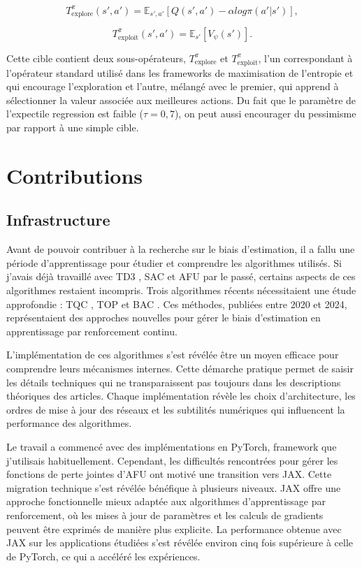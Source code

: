 \documentclass[a4paper, 12pt]{report}
\begin{document}
    $$
    T^\pi_{\text{explore}} (s', a') = \mathbb{E}_{s',a'} [ Q(s', a') - \alpha log \pi(a'|s')],
    $$

    $$
    T^\pi_{\text{exploit}} (s', a') = \mathbb{E}_{s'} [V_\psi (s')].
    $$

    Cette cible contient deux sous-opérateurs, $T^\pi_{\text{explore}}$ et
    $T^\pi_{\text{exploit}}$, l'un correspondant à l'opérateur standard utilisé
    dans les frameworks de maximisation de l'entropie et qui encourage
    l'exploration et l'autre, mélangé avec le premier, qui apprend à
    sélectionner la valeur associée aux meilleures actions. Du fait que le
    paramètre de l'expectile regression est faible ($\tau = 0,7$), on peut
    aussi encourager du pessimisme par rapport à une simple cible.

    \chapter{Contributions}

    \section{Infrastructure}

    Avant de pouvoir contribuer à la recherche sur le biais d'estimation, il a
    fallu une période d'apprentissage pour étudier et comprendre les
    algorithmes utilisés. Si j'avais déjà travaillé avec TD3 , SAC
    \cite{haarnoja2019softactorcriticalgorithmsapplications} et AFU
    \cite{perringilbert2024afuactorfreecriticupdates} par le passé, certains
    aspects de ces algorithmes restaient incompris. Trois algorithmes récents
    nécessitaient une étude approfondie : TQC , TOP et BAC . Ces méthodes,
    publiées entre 2020 et 2024, représentaient des approches nouvelles pour
    gérer le biais d'estimation en apprentissage par renforcement continu.

    L'implémentation de ces algorithmes s'est révélée être un moyen efficace
    pour comprendre leurs mécanismes internes. Cette démarche pratique permet
    de saisir les détails techniques qui ne transparaissent pas toujours dans
    les descriptions théoriques des articles. Chaque implémentation révèle les
    choix d'architecture, les ordres de mise à jour des réseaux et les
    subtilités numériques qui influencent la performance des algorithmes.

    Le travail a commencé avec des implémentations en PyTorch, framework que
    j'utilisais habituellement. Cependant, les difficultés rencontrées pour
    gérer les fonctions de perte jointes d'AFU ont motivé une transition vers
    JAX. Cette migration technique s'est révélée bénéfique à plusieurs niveaux.
    JAX offre une approche fonctionnelle mieux adaptée aux algorithmes
    d'apprentissage par renforcement, où les mises à jour de paramètres et les
    calculs de gradients peuvent être exprimés de manière plus explicite. La
    performance obtenue avec JAX sur les applications étudiées s'est révélée
    environ cinq fois supérieure à celle de PyTorch, ce qui a accéléré les
    expériences.
\end{document}
